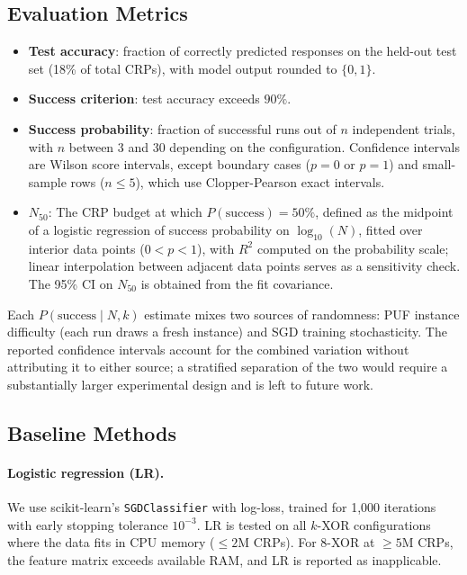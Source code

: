 \subsection{Evaluation Metrics}

\begin{itemize}
\item \textbf{Test accuracy}: fraction of correctly predicted responses on
  the held-out test set (18\% of total CRPs), with model output rounded to
  $\{0, 1\}$.
\item \textbf{Success criterion}: test accuracy exceeds $90\%$.
\item \textbf{Success probability}: fraction of successful runs out of $n$
  independent trials, with $n$ between 3 and 30 depending on the
  configuration.  Confidence intervals are Wilson score intervals, except
  boundary cases ($p = 0$ or $p = 1$) and small-sample rows ($n \leq 5$),
  which use Clopper-Pearson exact intervals.
\item \textbf{$N_{50}$}: The CRP budget at which $P(\text{success}) = 50\%$,
  defined as the midpoint of a logistic regression of success probability
  on $\log_{10}(N)$, fitted over interior data points ($0 < p < 1$), with
  $R^2$ computed on the probability scale; linear interpolation between
  adjacent data points serves as a sensitivity check.  The 95\% CI on
  $N_{50}$ is obtained from the fit covariance.
\end{itemize}

Each $P(\text{success} \mid N, k)$ estimate mixes two sources of randomness:
PUF instance difficulty (each run draws a fresh instance) and SGD training
stochasticity.  The reported confidence intervals account for the combined
variation without attributing it to either source; a stratified separation
of the two would require a substantially larger experimental design and is
left to future work.

\subsection{Baseline Methods}

\paragraph{Logistic regression (LR).} We use scikit-learn's
\texttt{SGDClassifier} with log-loss, trained for 1{,}000 iterations with
early stopping tolerance $10^{-3}$.  LR is tested on all $k$-XOR
configurations where the data fits in CPU memory ($\leq 2$M CRPs).
For 8-XOR at $\geq 5$M CRPs, the feature matrix exceeds available RAM, and
LR is reported as inapplicable.
